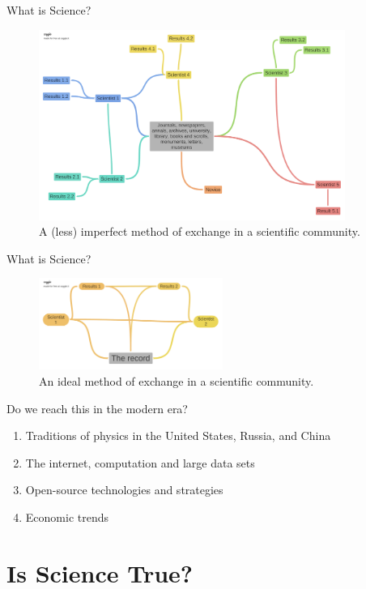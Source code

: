 \documentclass{beamer}
\begin{document}
\begin{frame}{What is Science?}
\begin{figure}
\centering
\includegraphics[width=10cm]{figures/ScientificExchange2.pdf}
\caption{A (less) imperfect method of exchange in a scientific community.}
\end{figure}
\end{frame}

\begin{frame}{What is Science?}
\small
\begin{figure}
\centering
\includegraphics[width=6cm]{figures/ScientificExchange3.pdf}
\caption{An ideal method of exchange in a scientific community.}
\end{figure}
Do we reach this in the modern era?
\begin{enumerate}
\item Traditions of physics in the United States, Russia, and China
\item The internet, computation and large data sets
\item Open-source technologies and strategies
\item Economic trends
\end{enumerate}
\end{frame}

\section{Is Science True?}
\end{document}
